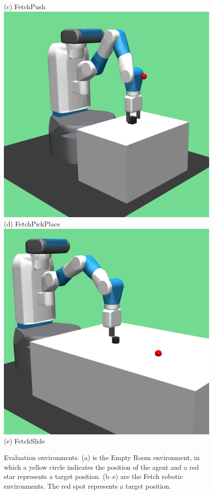 \begin{figure}[t]
  ({c}) FetchPush \hspace{3em}        
\endminipage\hfill
{}%
  \centering
  \includegraphics[width=\linewidth]{figures/chapter3/pick.png}
  ({d}) FetchPickPlace
\endminipage\hfill
{}%
  \centering
  \includegraphics[width=\linewidth]{figures/chapter3/slide.png}
  ({e}) FetchSlide \hspace{3em}       
\endminipage
\caption{Evaluation environments. ({a}) is the Empty Room environment, in which a yellow circle indicates the position of the agent and a red star represents a target position. ({b}--{e}) are the Fetch robotic environments. The red spot represents a target position.}
\label{fig:env}
\end{figure}


